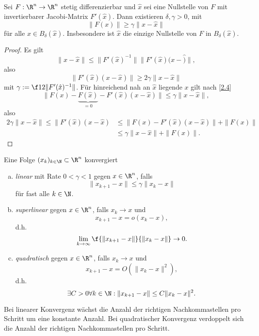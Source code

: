 \begin{lem} \label{2.43}
	Sei $F: \R^n \to \R^n$ stetig differenzierbar und $\hat x$ sei eine Nullstelle von $F$ mit invertierbarer Jacobi-Matrix $F'(\hat x)$.
	Dann existieren $\delta, \gamma > 0$, mit
	\[
		\|F(x)\|
		\ge \gamma \|x-\hat x\|
	\]
	für alle $x \in B_\delta(\hat x)$.
	Insbesondere ist $\hat x$ die einzige Nullstelle von $F$ in $B_\delta(\hat x)$.
	\begin{proof}
		Es gilt
		\[
			\|x-\hat x\| \le \|F'(\hat x)^{-1}\| \|F'(\hat x)(x-\hat)\|,
		\]
		also
		\[
			\|F'(\hat x)(x-\hat x)\|
			\ge 2\gamma \|x - \hat x\|
		\]
		mit $\gamma := \f 1{2\|F'(\hat x)^{-1}\|}$.
		Für hinreichend nah an $\hat x$ liegende $x$ gilt nach \ref{2.4}
		\[
			\|F(x) - \underbrace{F(\hat x)}_{=0} - F'(\hat x)(x-\hat x) \|
			\le \gamma \|x-\hat x\|,
		\]
		also
		\begin{align*}
			2\gamma \|x-\hat x\|
			\le \|F'(\hat x)(x-\hat x)
			&\le \|F(x) - F'(\hat x)(x-\hat x) \| + \|F(x)\| \\
			&\le \gamma \|x-\hat x\| + \| F(x) \|.
		\end{align*}
	\end{proof}
\end{lem}

\begin{df} \label{2.44}
	Eine Folge $(x_k)_{k\in\N} \subset \R^n$ konvergiert
	\begin{enumerate}[(a)]
		\item
			\emph{linear} mit Rate $0 < \gamma < 1$ gegen $x \in \R^n$, falls
			\[
				\|x_{k+1} - x\| \le \gamma \|x_k - x\|
			\]
			für fast alle $k \in \N$.
		\item
			\emph{superlinear} gegen $x \in \R^n$, falls $x_k \to x$ und
			\[
				x_{k+1} - x
				= o(x_k - x),
			\]
			d.h.
			\[
				\lim_{k\to\infty} \f {\|x_{k+1}-x\|}{\|x_k - x\|} \to 0.
			\]
		\item
			\emph{quadratisch} gegen $x\in \R^n$, falls $x_k \to x$ und
			\[
				x_{k+1} - x
				= O(\|x_k - x\|^2),
			\]
			d.h.
			\[
				\exists C > 0 \forall k\in \N : \|x_{k+1} - x \| \le C \|x_k - x\|^2.
			\]
	\end{enumerate}
\end{df}

\begin{nt} \label{2.45}
	Bei linearer Konvergenz wächst die Anzahl der richtigen Nachkommastellen pro Schritt um eine konstante Anzahl.
	Bei quadratischer Konvergenz verdoppelt sich die Anzahl der richtigen Nachkommastellen pro Schritt.
\end{nt}
